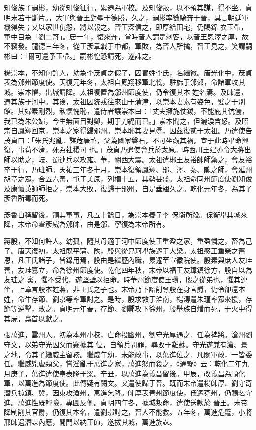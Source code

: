 \begin{pinyinscope}
 知俊族子嗣彬，幼從知俊征行，累遷為軍校。及知俊叛，以不預其謀，得不坐。貞明末若干斷片。，大軍與晉王對壘于德勝，久之，嗣彬率數騎奔于晉，具言朝廷軍機得失；又以家世仇怨，將以報之。晉王深信之，即厚給田宅，仍賜錦
 衣玉帶，軍中目為「劉二哥」。居一年，復來奔，當時晉人謂是刺客，以晉王恩澤之厚，故不竊發。龍德三年冬，從王彥章戰于中都，軍敗，為晉人所擒。晉王見之，笑謂嗣彬曰：「爾可還予玉帶。」嗣彬惶恐請死，遂誅之。



 楊崇本，不知何許人，幼為李茂貞之假子，因冒姓李氏，名繼徽。唐光化中，茂貞表為邠州節度使。天復元年冬，太祖自鳳翔移軍北伐，駐旆于邠郊，命諸軍攻其城。崇本懼，出城請降。太祖復置為邠州節度使，仍令復其本
 姓名焉。及師還，遷其族于河中。其後，太祖因統戎往來由于蒲津，以崇本妻素有姿色，嬖之于別館。其婦素剛烈，私懷愧恥，遣侍者讓崇本曰：「丈夫擁旄仗鉞，不能庇其伉儷，我已為朱公婦，今生無面目對卿，期于刀繩而已。」崇本聞之，但灑淚含怒。及昭宗自鳳翔回京，崇本之家得歸邠州。崇本恥其妻見辱，因茲復貳于太祖。乃遣使告茂貞曰：「朱氏兆亂，謀危唐祚，父為國家磐石，不可坐觀其禍，宜于此時畢命興復，事茍不濟，死為社稷可
 也。」茂貞乃遣使會兵於太原。時西川王建亦令大將出師以助之，岐、蜀連兵以攻雍、華，關西大震。太祖遣郴王友裕帥師禦之，會友裕卒于行，乃班師。天祐三年冬十月，崇本復領鳳翔、邠、涇、秦、隴之師，會延州胡章之眾，合五六萬，屯于美原，列柵十五，其勢甚盛。太祖命同州節度使劉知俊及康懷英帥師拒之，崇本大敗，復歸于邠州，自是垂翅久之。乾化元年冬，為其子彥魯所毒而死。



 彥魯自稱留後，領其軍事，凡五十餘日，為崇本養子李
 保衡所殺。保衡舉其城來降，末帝命霍彥威為邠帥，由是邠、寧復為末帝所有。



 蔣殷，不知何許人。幼孤，隨其母適于河中節度使王重盈之家，重盈憐之，畜為己子。唐天復初，太祖既平蒲、陜，殷與從兄珂舉族遷于大梁。太祖感王重榮之舊恩，凡王氏諸子，皆錄用焉，殷由是繼歷內職，累遷至宣徽院使。殷素與庶人友珪善，友珪篡立，命為徐州節度使。乾化四年秋，末帝以福王友璋鎮徐方，殷自以為友珪之
 黨，懼不受代，遂堅壁以拒命。時華州節度使王瓚，殷之從弟也，懼其連坐，上章言殷本姓蔣，非王氏之子也。末帝乃下詔削奪殷在身官爵，仍令卻還本姓，命牛存節、劉鄩等率軍討之。是時，殷求救于淮南，楊溥遣朱瑾率眾來援，存節等逆擊，敗之。貞明元年春，存節、劉鄩攻下徐州，殷舉族自燔而死，于火中得其屍，梟首以獻之。



 張萬進，雲州人。初為本州小校，亡命投幽州，劉守光厚遇之，任為裨將。滄州劉守文，以弟守光囚父而竊據其
 位，自領兵問罪，尋敗于雞蘇。守光遂兼有滄、景之地，令其子繼威主留務。繼威年幼，未能政事，以萬進佐之，凡關軍政，一皆委任。繼威兇虐類父，嘗淫亂于萬進之家，萬進怒而殺之，《通鑒》云：乾化二年九月庚子，萬進遣使奉表降于梁。辛丑，以萬進為義昌留後。甲辰，改義昌為順化軍，以萬進為節度使。此傳疑有闕文。又遣使歸于晉。既而末帝遣楊師厚、劉守奇潛兵掠鎮、冀，因東攻滄州，萬進乞降。師厚表青州節度使，俄遷兗州，仍賜名守進。萬進性既輕險，專圖反側。貞明四年冬，據城叛命，遣使送款於
 晉王。末帝降制削其官爵，仍復其本名，遣劉鄩討之，晉人不能救。五年冬，萬進危蹙，小將邢師遇潛謀內應，開門以納王師，遂拔其城，萬進族誅。




\end{pinyinscope}
